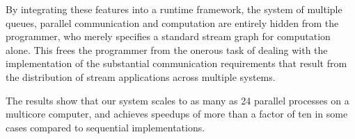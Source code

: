 \documentclass[10pt, conference, compsocconf, reqno]{IEEEtran}
\begin{document}
By integrating these features into a runtime framework, the system of multiple queues, parallel communication and computation are entirely hidden from the programmer, who merely specifies a standard stream graph for computation alone. This frees the programmer from the onerous task of dealing with the implementation of the substantial communication requirements that result from the distribution of stream applications across multiple systems.

The results show that our system scales to as many as 24 parallel processes on a multicore computer, and achieves speedups of more than a factor of ten in some cases compared to sequential implementations.

%
%



%
%
\end{document}
